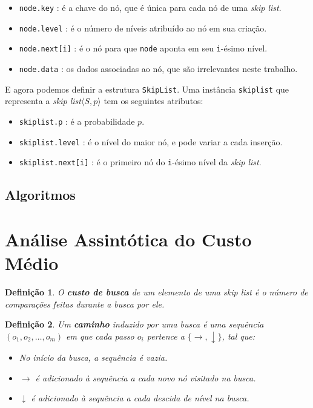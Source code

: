\documentclass[paper=a4, fontsize=11pt]{scrartcl} %
\newtheorem{definition}{Definição}
\numberwithin{equation}{section}
\numberwithin{figure}{section}
\numberwithin{table}{section}
\numberwithin{definition}{section}
\numberwithin{theorem}{section}
\numberwithin{property}{section}
\numberwithin{proposition}{section}
\newcommand{\skl}{\textit{skip list}\xspace}
\renewcommand{\sl}{\textit{skip list}\xspace}
\begin{document}
\begin{itemize}[noitemsep]
  \item \verb|node.key| : é a chave do nó, que é única para cada nó de uma \skl.
  \item \verb|node.level| : é o número de níveis atribuído ao nó em sua criação.
  \item \verb|node.next[i]| : é o nó para que \verb|node| aponta em seu \verb|i|-ésimo nível.
  \item \verb|node.data| : os dados associadas ao nó, que são irrelevantes neste trabalho.
\end{itemize}

E agora podemos definir a estrutura \verb|SkipList|. Uma instância \verb|skiplist| que representa a 
\skl $\langle S, p \rangle$ tem os seguintes atributos:

\begin{itemize}[noitemsep]
  \item \verb|skiplist.p| : é a probabilidade $p$.
  \item \verb|skiplist.level| : é o nível do maior nó, e pode variar a cada inserção.
  \item \verb|skiplist.next[i]| : é o primeiro nó do \verb|i|-ésimo nível da \skl.
\end{itemize}


\subsection{Algoritmos}

\pagebreak
\section{Análise Assintótica do Custo Médio}

\begin{definition}

O \textbf{custo de busca} de um elemento de uma \sl é o número de comparações feitas durante a busca por ele.

\end{definition}

\begin{definition}

Um \textbf{caminho} induzido por uma busca é uma sequência $(o_1, o_2, \ldots, o_m)$ 
em que cada passo $o_i$ pertence a $\{\rightarrow, \downarrow\}$, tal que:

\begin{itemize}[noitemsep]
  \item No início da busca, a sequência é vazia.
  \item $\rightarrow$ é adicionado à sequência a cada novo nó visitado na busca.
  \item $\downarrow$ é adicionado à sequência a cada descida de nível na busca.
\end{itemize}

\end{definition}
\end{document}

